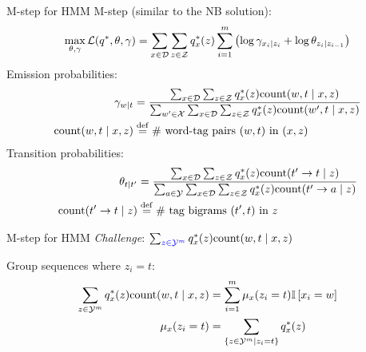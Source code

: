 \documentclass[usenames,dvipsnames,notes,11pt,aspectratio=169]{beamer}
\begin{document}
\begin{frame}
    {M-step for HMM}
    M-step (similar to the NB solution):
    \begin{align*}
        \max_{\theta,\gamma} \mathcal{L}(q^*, \theta, \gamma) = \sum_{x\in\mathcal{D}} \sum_{z\in\mathcal{Z}} q^*_x(z)
        \sum_{i=1}^m \left(  \log\gamma_{x_i\mid z_i} + \log \theta_{z_i\mid z_{i-1}}  \right)
    \end{align*}
    Emission probabilities:
    \begin{align*}
        \gamma_{w\mid t} &= \frac{
            \sum_{x\in\mathcal{D}} \sum_{z\in\mathcal{Z}} q^*_x(z) \text{count}(w,t\mid x,z)
        }{
            \sum_{w'\in\mathcal{X}} \sum_{x\in\mathcal{D}} \sum_{z\in\mathcal{Z}} q^*_x(z) \text{count}(w',t\mid x,z)
        }\\
        \text{count}(w,t\mid x,z) &\stackrel{\rm def}{=} \text{\# word-tag pairs $(w,t)$ in $(x,z)$} 
    \end{align*}
    Transition probabilities:
    \begin{align*}
        \theta_{t\mid t'} &= \frac{
            \sum_{x\in\mathcal{D}} \sum_{z\in\mathcal{Z}} q^*_x(z) \text{count}(t'\rightarrow t\mid z)
        }{
            \sum_{a\in\mathcal{Y}} \sum_{x\in\mathcal{D}} \sum_{z\in\mathcal{Z}} q^*_x(z) \text{count}(t'\rightarrow a\mid z)
        }\\
        \text{count}(t'\rightarrow t\mid z) &\stackrel{\rm def}{=} \text{\# tag bigrams $(t',t)$ in $z$} 
    \end{align*}
\end{frame}

\begin{frame}
    {M-step for HMM}
    \emph{Challenge}: $\sum_{{\color{blue}z\in\mathcal{Y}^m}} q^*_x(z) \text{count}(w,t\mid x,z)$

    \vspace{5em}
    
    \begin{center}
    \end{center}
    \vspace{-1em}
    Group sequences where $z_i=t$:
    \begin{align*}
    \sum_{{z\in\mathcal{Y}^m}} q^*_x(z) \text{count}(w,t\mid x,z)
        &= \sum_{i=1}^m \mu_x(z_i=t) \mathbb{I}\left[ x_i=w \right] \\
        \mu_x(z_i=t) &= \sum_{\left\{ z\in\mathcal{Y}^m \mid z_i=t \right\}} q^*_x(z)
    \end{align*}
\end{frame}
\end{document}
